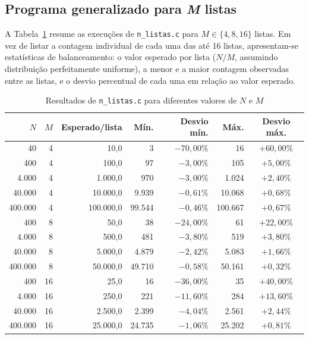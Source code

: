 \documentclass[a4paper,12pt]{article}
\begin{document}
\subsection{Programa generalizado para \textit{M} listas}

A Tabela~\ref{tab:n} resume as execuções de \texttt{n\_listas.c} para $M \in \{4, 8, 16\}$ listas. Em vez de listar a contagem individual de cada uma das até 16 listas, apresentam-se estatísticas de balanceamento: o valor esperado por lista ($N/M$, assumindo distribuição perfeitamente uniforme), a menor e a maior contagem observadas entre as listas, e o desvio percentual de cada uma em relação ao valor esperado.

\begin{table}[ht]
\centering
\caption{Resultados de \texttt{n\_listas.c} para diferentes valores de $N$ e $M$}
\label{tab:n}
\begin{tabular}{@{}rrrrrrc@{}}
\toprule
$N$ & $M$ & Esperado/lista & Mín. & Desvio mín. & Máx. & Desvio máx. \\
\midrule
40      & 4  & 10{,}0     & 3     & $-70{,}00\%$ & 16    & $+60{,}00\%$ \\
400     & 4  & 100{,}0    & 97    & $-3{,}00\%$  & 105   & $+5{,}00\%$  \\
4.000   & 4  & 1.000{,}0  & 970   & $-3{,}00\%$  & 1.024 & $+2{,}40\%$  \\
40.000  & 4  & 10.000{,}0 & 9.939 & $-0{,}61\%$  & 10.068& $+0{,}68\%$  \\
400.000 & 4  & 100.000{,}0& 99.544& $-0{,}46\%$  & 100.667& $+0{,}67\%$ \\
\midrule
400     & 8  & 50{,}0     & 38    & $-24{,}00\%$ & 61    & $+22{,}00\%$ \\
4.000   & 8  & 500{,}0    & 481   & $-3{,}80\%$  & 519   & $+3{,}80\%$  \\
40.000  & 8  & 5.000{,}0  & 4.879 & $-2{,}42\%$  & 5.083 & $+1{,}66\%$  \\
400.000 & 8  & 50.000{,}0 & 49.710& $-0{,}58\%$  & 50.161& $+0{,}32\%$  \\
\midrule
400     & 16 & 25{,}0     & 16    & $-36{,}00\%$ & 35    & $+40{,}00\%$ \\
4.000   & 16 & 250{,}0    & 221   & $-11{,}60\%$ & 284   & $+13{,}60\%$ \\
40.000  & 16 & 2.500{,}0  & 2.399 & $-4{,}04\%$  & 2.561 & $+2{,}44\%$  \\
400.000 & 16 & 25.000{,}0 & 24.735& $-1{,}06\%$  & 25.202& $+0{,}81\%$  \\
\bottomrule
\end{tabular}
\end{table}
\end{document}

